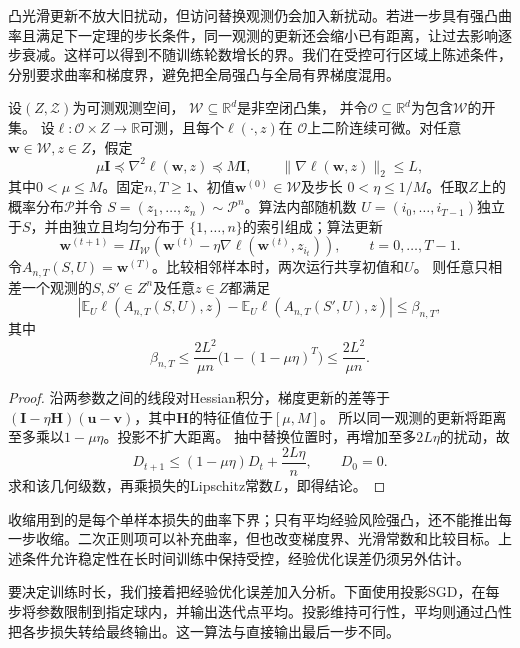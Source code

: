 凸光滑更新不放大旧扰动，但访问替换观测仍会加入新扰动。若进一步具有强凸曲率且满足下一定理的步长条件，同一观测的更新还会缩小已有距离，让过去影响逐步衰减。这样可以得到不随训练轮数增长的界。我们在受控可行区域上陈述条件，分别要求曲率和梯度界，避免把全局强凸与全局有界梯度混用。

\begin{theorem}[强凸投影SGD的稳定性]
\label{thm:strongly-convex-sgd-stability}
设$(Z,\mathcal Z)$为可测观测空间，
$\mathcal W\subseteq\mathbb R^d$是非空闭凸集，
并令$\mathcal O\subseteq\mathbb R^d$为包含$\mathcal W$的开集。
设$\ell:\mathcal O\times Z\to\mathbb R$可测，且每个$\ell(\cdot,z)$在
$\mathcal O$上二阶连续可微。对任意$\bm w\in\mathcal W,z\in Z$，假定
\[
 \mu\bm I\preceq\nabla^2\ell(\bm w,z)\preceq M\bm I,
 \qquad \|\nabla\ell(\bm w,z)\|_2\leq L,
\]
其中$0<\mu\leq M$。固定$n,T\geq1$、初值$\bm w^{(0)}\in\mathcal W$及步长
$0<\eta\leq1/M$。任取$Z$上的概率分布$\mathcal P$并令
$S=(z_1,\ldots,z_n)\sim\mathcal P^n$。算法内部随机数
$U=(i_0,\ldots,i_{T-1})$独立于$S$，并由独立且均匀分布于
$\{1,\ldots,n\}$的索引组成；算法更新
\[
 \bm w^{(t+1)}
 =\Pi_{\mathcal W}\!\left(
 \bm w^{(t)}-\eta\nabla\ell(\bm w^{(t)},z_{i_t})\right),
 \qquad t=0,\ldots,T-1.
\]
令$A_{n,T}(S,U)=\bm w^{(T)}$。比较相邻样本时，两次运行共享初值和$U$。
则任意只相差一个观测的$S,S'\in Z^n$及任意$z\in Z$都满足
\[
 \left|\mathbb E_U\ell(A_{n,T}(S,U),z)
 -\mathbb E_U\ell(A_{n,T}(S',U),z)\right|\leq\beta_{n,T},
\]
其中
\[
 \beta_{n,T}\leq\frac{2L^2}{\mu n}
           \bigl(1-(1-\mu\eta)^T\bigr)
 \leq\frac{2L^2}{\mu n}.
\]
\end{theorem}
\begin{proof}
沿两参数之间的线段对Hessian积分，梯度更新的差等于
$(\bm I-\eta\bm H)(\bm u-\bm v)$，其中$\bm H$的特征值位于$[\mu,M]$。
所以同一观测的更新将距离至多乘以$1-\mu\eta$。投影不扩大距离。
抽中替换位置时，再增加至多$2L\eta$的扰动，故
\[
 D_{t+1}\leq(1-\mu\eta)D_t+\frac{2L\eta}{n},\qquad D_0=0.
\]
求和该几何级数，再乘损失的Lipschitz常数$L$，即得结论。
\end{proof}

收缩用到的是每个单样本损失的曲率下界；只有平均经验风险强凸，还不能推出每一步收缩。二次正则项可以补充曲率，但也改变梯度界、光滑常数和比较目标。上述条件允许稳定性在长时间训练中保持受控，经验优化误差仍须另外估计。

要决定训练时长，我们接着把经验优化误差加入分析。下面使用投影SGD，在每步将参数限制到指定球内，并输出迭代点平均。投影维持可行性，平均则通过凸性把各步损失转给最终输出。这一算法与直接输出最后一步不同。

